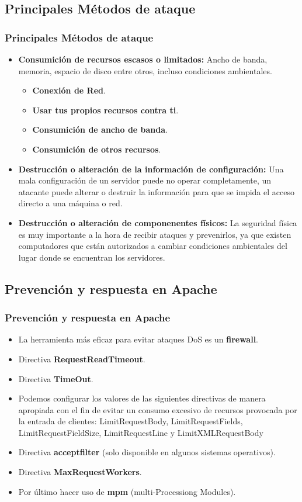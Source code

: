 \documentclass{beamer}
\begin{document}
	\subsection{Principales Métodos de ataque}
	\begin{frame}
	\frametitle{Principales Métodos de ataque}
		\begin{itemize}
\item \textbf{Consumición de recursos escasos o limitados:} Ancho de banda, memoria, espacio de disco entre otros, incluso condiciones ambientales.
\begin{itemize}
\item \textbf{Conexión de Red}.
\item \textbf{Usar tus propios recursos contra ti}. 
\item \textbf{Consumición de ancho de banda}. 
\item \textbf{Consumición de otros recursos}. 
\end{itemize}
\item \textbf{Destrucción o alteración de la información de configuración:} Una mala configuración de un servidor puede no operar completamente, un atacante puede alterar o destruir la información para que se impida el acceso directo a una máquina o red.
\item \textbf{Destrucción o alteración de componenentes físicos:}
La seguridad física es muy importante a la hora de recibir ataques y prevenirlos, ya que existen computadores que están autorizados a cambiar condiciones ambientales del lugar donde se encuentran los servidores.
\end{itemize}
	\end{frame}	
	
	\subsection{Prevención y respuesta en Apache}
	\begin{frame}
	\frametitle{Prevención y respuesta en Apache}
		\begin{itemize}
\item La herramienta más eficaz para evitar ataques DoS es un \textbf{firewall}.
\item Directiva \textbf{RequestReadTimeout}.
\item Directiva \textbf{TimeOut}.
\item Podemos configurar los valores de las siguientes directivas de manera apropiada con el fin de evitar un consumo excesivo de recursos provocada por la entrada de clientes: 
LimitRequestBody, LimitRequestFields, LimitRequestFieldSize, LimitRequestLine y LimitXMLRequestBody
\item Directiva \textbf{acceptfilter} (solo disponible en algunos sistemas operativos).
\item Directiva \textbf{MaxRequestWorkers}.
\item Por último hacer uso de \textbf{mpm} (multi-Processiong Modules).
\end{itemize}
	\end{frame}
	
\end{document}
